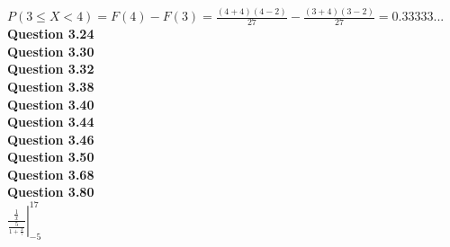 \documentclass{article}
\begin{document}
    $P(3\leq X<4) = F(4) - F(3) = \frac{(4+4)(4-2)}{27} - \frac{(3+4)(3-2)}{27} = 0.33333...$\\
    \textbf{Question 3.24}\\
    \textbf{Question 3.30}\\
    \textbf{Question 3.32}\\
    \textbf{Question 3.38}\\
    \textbf{Question 3.40}\\
    \textbf{Question 3.44}\\
    \textbf{Question 3.46}\\
    \textbf{Question 3.50}\\
    \textbf{Question 3.68}\\
    \textbf{Question 3.80}\\

    $  \left.\frac{\frac{1}{x}}{\frac{5}{1+\frac{x}{7}}}\right\vert_{-5}^{17}$\\
    
\end{document}
